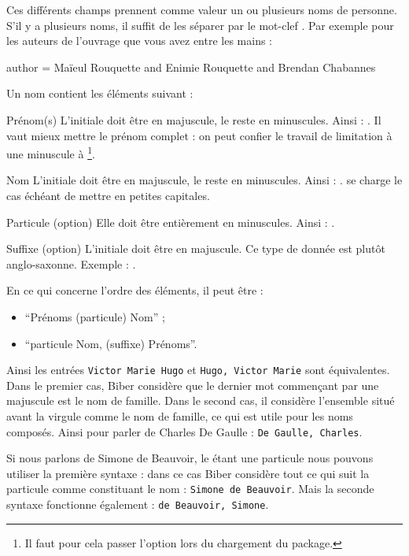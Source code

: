 Ces différents champs prennent comme valeur un ou plusieurs noms de personne. S'il y a plusieurs noms, il suffit de les séparer par le mot-clef . Par exemple pour les auteurs de l'ouvrage que vous avez entre les mains : 

\begin{latexcode}
author = {Maïeul Rouquette and Enimie Rouquette and Brendan Chabannes}
\end{latexcode}

Un nom contient les éléments suivant :
\begin{choix}
	\item[Prénom(s)]L'initiale doit être en majuscule, le reste en minuscules. Ainsi : . Il vaut mieux mettre le prénom complet : on peut confier le travail de limitation à une minuscule  à \footnote{Il faut pour cela passer l'option  lors du chargement du package.}.
	\item[Nom]L'initiale doit être en majuscule, le reste en minuscules. Ainsi : .  se charge le cas échéant de mettre en petites capitales.
	\item[Particule (option)]Elle doit être entièrement en minuscules. Ainsi : .
	\item[Suffixe (option)]L'initiale doit être en majuscule. Ce type de donnée est plutôt anglo-saxonne. Exemple : .
\end{choix}


En ce qui concerne l'ordre des éléments, il  peut être :
\begin{itemize}
\item\enquote{Prénoms  (particule)  Nom} ;
\item\enquote{particule Nom, (suffixe) Prénoms}.
\end{itemize}

Ainsi les entrées \verb|Victor Marie Hugo| et \verb|Hugo, Victor Marie| sont équivalentes.
Dans le premier cas, Biber considère que le dernier mot commençant par une majuscule est le nom de famille. Dans le second cas, il considère l'ensemble situé avant la virgule comme le nom de famille, ce qui est utile pour les noms composés. Ainsi pour parler de Charles De Gaulle : \verb|De Gaulle, Charles|.

Si nous parlons de Simone de Beauvoir, le  étant une particule nous pouvons utiliser la première syntaxe : dans ce cas Biber considère tout ce qui suit la particule comme constituant le nom : \verb|Simone de Beauvoir|.
Mais la seconde syntaxe fonctionne également : \verb|de Beauvoir, Simone|.


